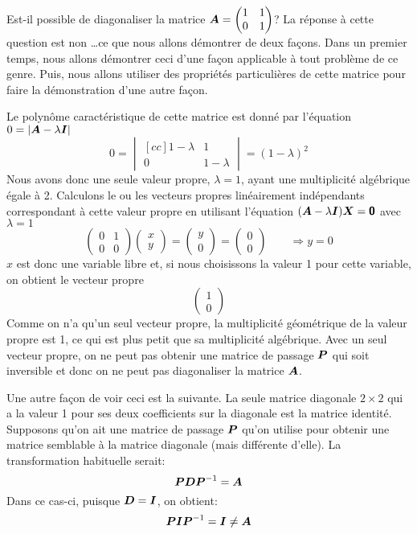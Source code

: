 \begin{exemple}
Est-il possible de diagonaliser la matrice $\displaystyle\boldsymbol{A}= \begin{pmatrix}
1 & 1 \\ 0 & 1
\end{pmatrix}$?
\solution
La réponse à cette question est non \ldots ce que nous allons démontrer de deux façons.
Dans un premier temps, nous allons démontrer ceci d'une façon applicable à tout problème
de ce genre.  Puis, nous allons utiliser des propriétés particulières de cette matrice
pour faire la démonstration d'une autre façon.

Le polynôme caractéristique de cette matrice est donné par l'équation $0 = |\boldsymbol{A}-\lambda\boldsymbol{I}|$
\[
0 = \begin{vmatrix}[cc]
1-\lambda & 1 \\ 0 & 1-\lambda
\end{vmatrix} = (1-\lambda)^2 
\]
Nous avons donc une seule valeur propre, $\lambda = 1$, ayant une multiplicité algébrique
égale à 2.  Calculons le ou les vecteurs propres linéairement indépendants correspondant
à cette valeur propre en utilisant l'équation $(\boldsymbol{A}-\lambda\boldsymbol{I})\boldsymbol{X} = \mbox{\textsf{\textbf{{0}}}}$ avec
$\lambda = 1$
\[
\begin{pmatrix}
0 & 1 \\ 0 & 0
\end{pmatrix}\begin{pmatrix}
x \\ y
\end{pmatrix}= \begin{pmatrix}
y \\ 0
\end{pmatrix}=\begin{pmatrix}
0 \\ 0
\end{pmatrix} \qquad\Rightarrow y = 0
\]
$x$ est donc une variable libre et, si nous choisissons la valeur 1 pour cette variable, on
obtient le vecteur propre
\[
\begin{pmatrix}
1\\ 0
\end{pmatrix}
\]
Comme on n'a qu'un seul vecteur propre, la multiplicité géométrique de la valeur propre est 1, 
ce qui est plus petit que sa multiplicité algébrique.  Avec un seul vecteur propre, on ne
peut pas obtenir une matrice de passage $\boldsymbol{P}$ qui soit inversible et donc on ne peut pas
diagonaliser la matrice $\boldsymbol{A}$.

Une autre façon de voir ceci est la suivante.  La seule matrice diagonale $2\times 2$ qui a la
valeur 1 pour ses deux coefficients sur la diagonale est la matrice identité.  Supposons qu'on
ait une matrice de passage $\boldsymbol{P}$ qu'on utilise pour obtenir une matrice semblable à la 
matrice diagonale (mais différente d'elle).  La transformation habituelle serait:
\[
\boldsymbol{P}\boldsymbol{D}\boldsymbol{P}^{-1} = \boldsymbol{A}
\]
Dans ce cas-ci, puisque $\boldsymbol{D} = \boldsymbol{I}$, on obtient:
\[
\boldsymbol{P}\boldsymbol{I}\boldsymbol{P}^{-1} = \boldsymbol{I} \neq \boldsymbol{A}
\]
\end{exemple}
